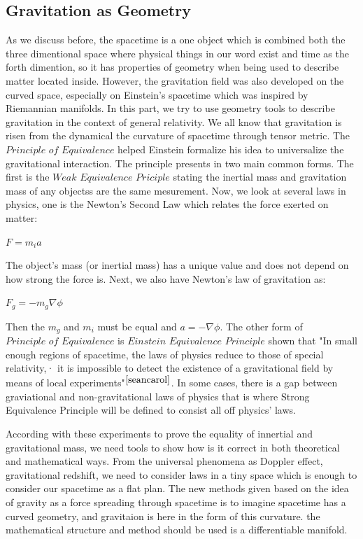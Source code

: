 \documentclass[11pt,a4paper]{article}
\begin{document}
	\subsection{Gravitation as Geometry}
	As we discuss before, the spacetime is a one object which is combined both the three dimentional space where physical things in our word exist and time as the forth dimention, so it has properties of geometry when being used to describe matter located inside. However,  the gravitation field was also developed on the curved space, especially on Einstein's spacetime which was inspired by Riemannian manifolds. In this part, we try to use geometry tools to describe gravitation in the context of general relativity. We all know that gravitation is risen from the dynamical the curvature of spacetime through  tensor metric. The $\textit{Principle of Equivalence}$ helped Einstein formalize his idea to universalize the gravitational interaction. The principle presents in two main common forms. The first is the $\textit{Weak Equivalence Priciple}$ stating the inertial mass and  gravitation mass of any objectss are the same mesurement. Now, we look at several laws in physics, one is the Newton's Second Law which relates the force exerted on matter: 
	\begin{center}
		$F = m_i a$
	\end{center}	
	The object's mass (or inertial mass) has a unique value and does not depend on how strong the force is. Next, we also have Newton's law of gravitation as: 
	\begin{center}
			$F_g = - m_g \nabla\phi$		
	\end{center}
	Then the $m_g$ and $m_i$ must be equal and  $a = -\nabla \phi$. The other form of  $\textit{Principle of Equivalence}$  is $\textit{Einstein Equivalence Principle}$ shown that "In small enough regions of spacetime, the laws of physics reduce to those of special relativity,· it is impossible to detect the existence of a gravitational field by means of local experiments"$^{\cite{seancarol}}$. In some cases, there is a gap between graviational and non-gravitational laws of physics that is where Strong  Equivalence Principle will be defined  to consist all off  physics' laws.
	
	According with these experiments to  prove the equality of innertial and gravitational mass, we need tools to show how is it correct in both theoretical and mathematical ways.  From the universal phenomena as Doppler effect, gravitational redshift, we need to consider laws in a tiny space which is enough to consider our spacetime as a flat plan. The new methods given based on  the idea of gravity as a force spreading through spacetime is to imagine spacetime has a curved geometry, and gravitaion  is here in the form of this curvature. the mathematical structure and method should be used is  a differentiable manifold. 
\end{document}
